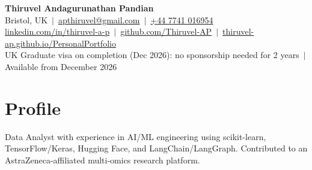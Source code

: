 \documentclass[a4paper,10pt]{article}
\begin{document}
\fontsize{10.5}{12.6}\selectfont

\begin{center}
  {\LARGE\bfseries Thiruvel Andagurunathan Pandian}\\[3pt]
  Bristol, UK \,$|$\, \href{mailto:apthiruvel@gmail.com}{apthiruvel@gmail.com} \,$|$\, \href{tel:+447741016954}{+44 7741 016954}\\[1pt]
\href{https://www.linkedin.com/in/thiruvel-a-p/}{linkedin.com/in/thiruvel-a-p} \,$|$\, \href{https://github.com/Thiruvel-AP}{github.com/Thiruvel-AP} \,$|$\, \href{https://thiruvel-ap.github.io/PersonalPortfolio/}{thiruvel-ap.github.io/PersonalPortfolio}\\[1pt]
  UK Graduate visa on completion (Dec 2026): no sponsorship needed for 2 years \,$|$\, Available from December 2026
\end{center}

\section{Profile}
Data Analyst with experience in AI/ML engineering using scikit-learn, TensorFlow/Keras, Hugging Face, and LangChain/LangGraph. Contributed to an AstraZeneca-affiliated multi-omics research platform.

\end{document}
